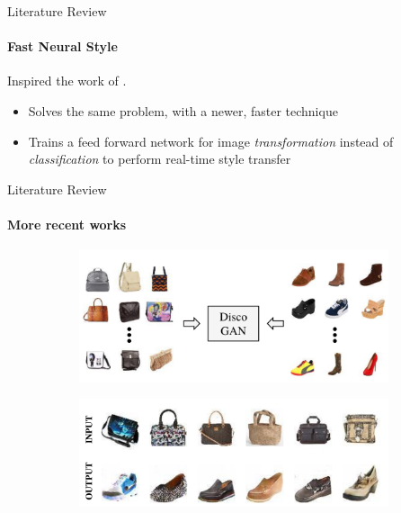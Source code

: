 \documentclass{beamer}
\begin{document}
\begin{frame}{Literature Review}
    \framesubtitle{Fast Neural Style}
    Inspired the work of .
    \begin{itemize}
        \item Solves the same problem, with a newer, faster technique
        \item Trains a feed forward network for image \textit{transformation}
        instead of \textit{classification} to perform real-time style transfer
    \end{itemize}
\end{frame}

\begin{frame}{Literature Review}
    \framesubtitle{More recent works}
    \begin{figure}[H]
        \centering
        \begin{subfigure}[b]{.8\textwidth}
            \includegraphics[width=\textwidth]{img/discoGanI.png}
        \end{subfigure}
        \begin{subfigure}[b]{.8\textwidth}
            \includegraphics[width=\textwidth]{img/discoGanII.png}
        \end{subfigure}
        \caption*{}
    \end{figure}
\end{frame}
\end{document}
